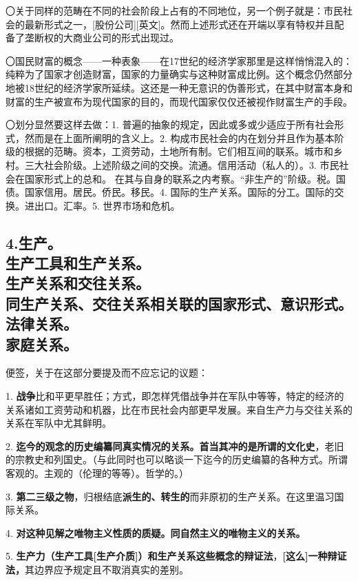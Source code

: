 \documentclass[a5paper,twoside,10.5pt]{ctexart}
\begin{document}
〇关于同样的范畴在不同的社会阶段上占有的不同地位，另一个例子就是：市民社会的最新形式之一，[股份公司][英文]。然而上述形式还在开端以享有特权并且配备了垄断权的大商业公司的形式出现过。

〇国民财富的概念——一种表象——在17世纪的经济学家那里是这样悄悄混入的：纯粹为了国家才创造财富，国家的力量确实与这种财富成比例。这个概念仍然部分地被18世纪的经济学家所延续。这还是一种无意识的伪善形式，在其中财富本身和财富的生产被宣布为现代国家的目的，而现代国家仅仅还被视作财富生产的手段。

〇划分显然要这样去做：1. 普遍的抽象的规定，因此或多或少适应于所有社会形式，然而是在上面所阐明的含义上。2. 构成市民社会的内在划分并且作为基本阶级的根据的范畴。资本，工资劳动，土地所有制。它们相互间的联系。城市和乡村。三大社会阶级。上述阶级之间的交换。流通。信用活动（私人的）。3. 市民社会在国家形式上的总和。 在其与自身的联系之内考察。“非生产的”阶级。税。国债。国家信用。居民。侨民。移民。4. 国际的生产关系。国际的分工。国际的交换。进出口。汇率。5. 世界市场和危机。

\newpage

\subsection{4.生产。\\生产工具和生产关系。\\生产关系和交往关系。\\同生产关系、交往关系相关联的国家形式、意识形式。\\法律关系。\\家庭关系。}

便签，关于在这部分要提及而不应忘记的议题：

1. \textbf{战争}比和平更早胜任；方式，即怎样凭借战争并在军队中等等，特定的经济的关系诸如工资劳动和机器，比在市民社会内部更早发展。来自生产力与交往关系的关系在军队中尤其鲜明。

2. \textbf{迄今的观念的历史编纂同真实情况的关系。首当其冲的是所谓的文化史}，老旧的宗教史和列国史。（与此同时也可以略谈一下迄今的历史编纂的各种方式。所谓客观的。主观的（伦理的等等）。哲学的。）

3. \textbf{第二三级之物}，归根结底\textbf{派生的、转生的}而非原初的生产关系。在这里温习国际关系。

4. \textbf{对这种见解之唯物主义性质的质疑。同自然主义的唯物主义的关系。}

5. \textbf{生产力（生产工具[生产介质]）和生产关系这些概念的辩证法}，\textbf{[这么]一种辩证法，}其边界应予规定且不取消真实的差别。
\end{document}
